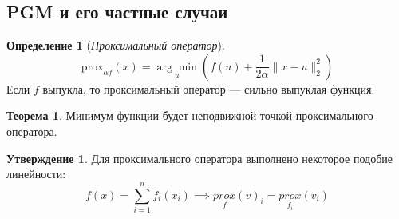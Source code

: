 \documentclass[11pt,a4paper]{report}
\theoremstyle{definition}
\theoremstyle{definition}
\newtheorem{theorem}{Теорема}[section]
\newtheorem{statement}{Утверждение}[section]
\theoremstyle{definition}
\newtheorem*{definition}{Определение}
\begin{document}
	\subsection{PGM и его частные случаи}
	\begin{definition}[\textit{Проксимальный оператор}]
		$$
			\mathrm{prox}_{\alpha f}(x) = \underset{u}{\arg\min} \left (f(u) + \frac{1}{2\alpha}\| x - u \|_2^2\right )
		$$
		Если $ f $ выпукла, то проксимальный оператор — сильно выпуклая функция.
	\end{definition}
	\begin{theorem}
		Минимум функции будет неподвижной точкой проксимального оператора.
	\end{theorem}
	\begin{statement}
		Для проксимального оператора выполнено некоторое подобие линейности:
		$$
			f(x) = \sum\limits_{i=1}^{n} f_{i}(x_i) \implies \underset{f}{prox}(v)_{i} = \underset{f_i}{prox}(v_i) 
		$$
	\end{statement}
\end{document}
